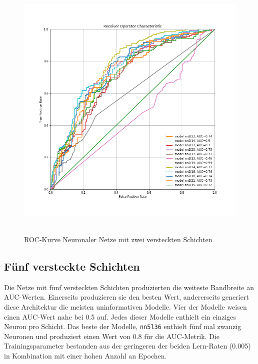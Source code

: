 \documentclass{article}
\begin{document}
\begin{center}
\begin{figure}[ht]
\centering
\caption{ROC-Kurve Neuronaler Netze mit zwei versteckten Schichten}
\label{rocNN2L}
\includegraphics[width=15cm, height=13cm]{../rocNN2L.png}
\end{figure}
\end{center}

\subsection{F{\"u}nf versteckte Schichten}

Die Netze mit f{\"u}nf versteckten Schichten produzierten die weiteste Bandbreite an AUC-Werten. Einerseits produzieren sie den besten Wert, andererseits generiert diese Architektur die meisten uninformativen Modelle. Vier der Modelle weisen einen AUC-Wert nahe bei 0.5 auf. Jedes dieser Modelle enthielt ein einziges Neuron pro Schicht. Das beste der Modelle, \texttt{nn5l36} enthielt f{\"u}nf mal zwanzig Neuronen und produziert einen Wert von 0.8 f{\"u}r die AUC-Metrik. Die Trainingsparameter bestanden aus der geringeren der beiden Lern-Raten (0.005) in Kombination mit einer hohen Anzahl an Epochen.
\end{document}
